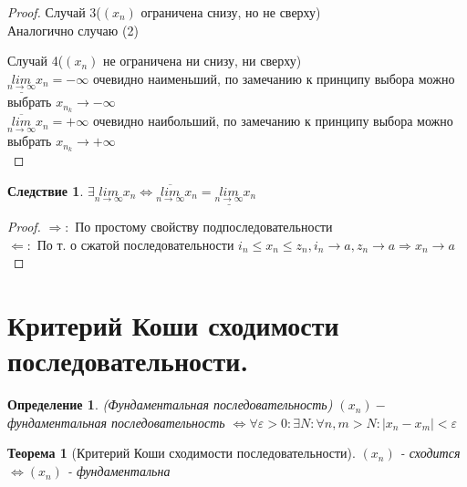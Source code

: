 \documentclass[11pt,a4paper,titlepage]{article}
\newtheorem*{theorem}{Теорема}
\newtheorem*{corollary}{Следствие}
\newtheorem*{definition}{Определение}
\renewcommand{\lim}[2]{\underset{#1 \rightarrow #2}{lim}}
\newcommand{\limn}{\lim{n}{\infty}}
\renewcommand{\implies}{\Rightarrow}
\newcommand{\bimplies}{\Leftarrow}
\renewcommand{\iff}{\Leftrightarrow}
\renewcommand{\epsilon}{\varepsilon}
\newcommand{\limsupn}{\overline{\limn}}
\newcommand{\liminfn}{\underline{\limn}}
\begin{document}
\begin{proof}
        \item{Случай 3}($(x_n)$ ограничена снизу, но не сверху)\\
        Аналогично случаю (2)

        \item{Случай 4}($(x_n)$ не ограничена ни снизу, ни сверху)\\
        $\liminfn x_n = -\infty$ очевидно наименьший, по замечанию к принципу выбора можно выбрать $x_{n_k} \to -\infty$\\
        $\limsupn x_n = +\infty$ очевидно наибольший, по замечанию к принципу выбора можно выбрать $x_{n_k} \to +\infty$\\
    \end{proof}

    \begin{corollary}
        $\exists \limn x_n \iff \limsupn x_n = \liminfn x_n$
    \end{corollary}

    \begin{proof}
        $\implies:$ По простому свойству подпоследовательности\\
        $\bimplies:$ По т. о сжатой последовательности $i_n \leq x_n \leq z_n, i_n \to a, z_n \to a \implies x_n \to a$
    \end{proof}


    \section{Критерий Коши сходимости последовательности.}

    \begin{definition}
        (Фундаментальная последовательность)
        $(x_n) - $ фундаментальная последовательность $\iff \forall \epsilon > 0: \exists N: \forall n, m > N: |x_n - x_m| < \epsilon$
    \end{definition}

    \begin{theorem}[Критерий Коши сходимости последовательности]
        $(x_n)$ - сходится $\iff (x_n)$ - фундаментальна
    \end{theorem}
\end{document}
